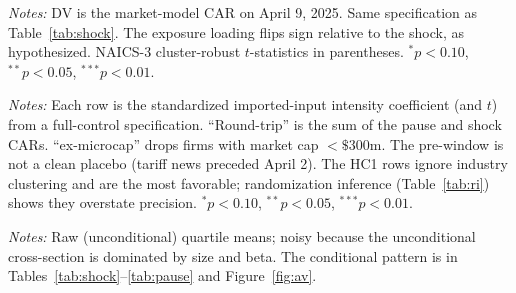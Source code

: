 \documentclass[12pt]{article}
\begin{document}
\begin{table}[htbp]\centering
\begin{threeparttable}
\caption{Tariff PAUSE: CAR[Apr 9] on imported-input intensity}\label{tab:pause}\small

\begin{tablenotes}\small\item \textit{Notes:} DV is the market-model CAR on April 9, 2025.
Same specification as Table~\ref{tab:shock}. The exposure loading flips sign relative to the
shock, as hypothesized. NAICS-3 cluster-robust $t$-statistics in parentheses.
$^{*}p<0.10$, $^{**}p<0.05$, $^{***}p<0.01$.
\end{tablenotes}
\end{threeparttable}
\end{table}

\begin{table}[htbp]\centering
\begin{threeparttable}
\caption{Robustness: imported-input-intensity loading across designs}\label{tab:robust}\small

\begin{tablenotes}\small\item \textit{Notes:} Each row is the standardized imported-input
intensity coefficient (and $t$) from a full-control specification. ``Round-trip'' is the sum
of the pause and shock CARs. ``ex-microcap'' drops firms with market cap $<\$300$m. The
pre-window is not a clean placebo (tariff news preceded April 2). The HC1 rows ignore
industry clustering and are the most favorable; randomization inference (Table~\ref{tab:ri})
shows they overstate precision. $^{*}p<0.10$, $^{**}p<0.05$, $^{***}p<0.01$.
\end{tablenotes}
\end{threeparttable}
\end{table}

\begin{table}[htbp]\centering
\begin{threeparttable}
\caption{Mean CARs by imported-input-intensity quartile}\label{tab:quartiles}\small

\begin{tablenotes}\small\item \textit{Notes:} Raw (unconditional) quartile means; noisy
because the unconditional cross-section is dominated by size and beta. The conditional
pattern is in Tables~\ref{tab:shock}--\ref{tab:pause} and Figure~\ref{fig:av}.
\end{tablenotes}
\end{threeparttable}
\end{table}
\end{document}
